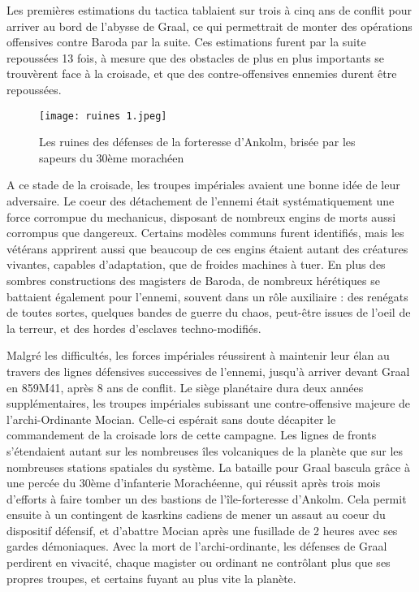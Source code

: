 \documentclass[10pt,a4paper]{book}
\begin{document}
Les premières estimations du tactica tablaient sur trois à cinq ans de conflit pour arriver au bord de l'abysse de Graal, ce qui permettrait de monter des opérations offensives contre Baroda par la suite. Ces estimations furent par la suite repoussées 13 fois, à mesure que des obstacles de plus en plus importants se trouvèrent face à la croisade, et que des contre-offensives ennemies durent être repoussées. 

\begin{wrapfigure}{r}{0.3\textwidth}
  \centering
  \texttt{[image: ruines 1.jpeg]}
  \caption{Les ruines des défenses de la forteresse d'Ankolm, brisée par les sapeurs du 30ème morachéen}
\end{wrapfigure}

A ce stade de la croisade, les troupes impériales avaient une bonne idée de leur adversaire. Le coeur des détachement de l'ennemi était systématiquement une force corrompue du mechanicus, disposant de nombreux engins de morts aussi corrompus que dangereux. Certains modèles communs furent identifiés, mais les vétérans apprirent aussi que beaucoup de ces engins étaient autant des créatures vivantes, capables d'adaptation, que de froides machines à tuer. En plus des sombres constructions des magisters de Baroda, de nombreux hérétiques se battaient également pour l'ennemi, souvent dans un rôle auxiliaire : des renégats de toutes sortes, quelques bandes de guerre du chaos, peut-être issues de l'oeil de la terreur, et des hordes d'esclaves techno-modifiés.



Malgré les difficultés, les forces impériales réussirent à maintenir leur élan au travers des lignes défensives successives de l'ennemi, jusqu'à arriver devant Graal en 859M41, après 8 ans de conflit. Le siège planétaire dura deux années supplémentaires, les troupes impériales subissant une contre-offensive majeure de l'archi-Ordinante Mocian. Celle-ci espérait sans doute décapiter le commandement de la croisade lors de cette campagne. Les lignes de fronts s'étendaient autant sur les nombreuses îles volcaniques de la planète que sur les nombreuses stations spatiales du système. La bataille pour Graal bascula grâce à une percée du 30ème d'infanterie Morachéenne, qui réussit après trois mois d'efforts à faire tomber un des bastions de l'île-forteresse d'Ankolm. Cela permit ensuite à un contingent de kasrkins cadiens de mener un assaut au coeur du dispositif défensif, et d'abattre Mocian après une fusillade de 2 heures avec ses gardes démoniaques. Avec la mort de l'archi-ordinante, les défenses de Graal perdirent en vivacité, chaque magister ou ordinant ne contrôlant plus que ses propres troupes, et certains fuyant au plus vite la planète.
\end{document}
